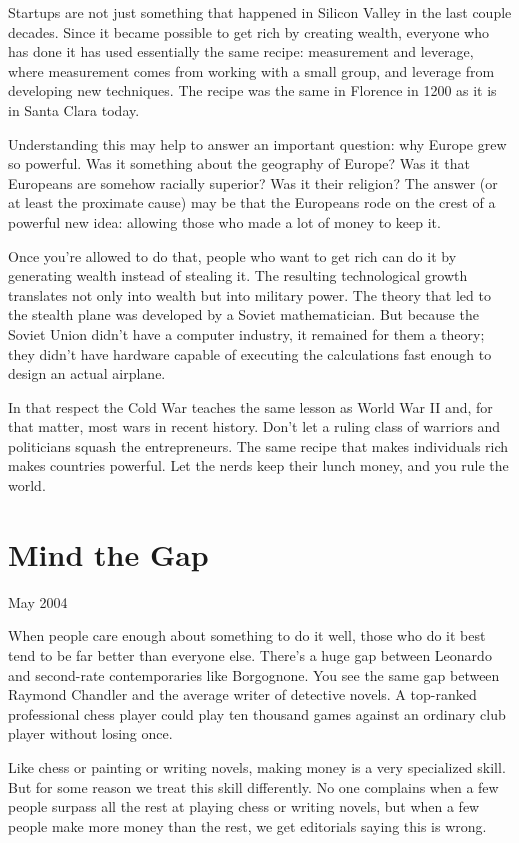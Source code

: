 \documentclass[12pt]{book}
\begin{document}
Startups are not just something that happened in Silicon Valley in the
last couple decades. Since it became possible to get rich by creating
wealth, everyone who has done it has used essentially the same recipe:
measurement and leverage, where measurement comes from working with a
small group, and leverage from developing new techniques. The recipe was
the same in Florence in 1200 as it is in Santa Clara today.

Understanding this may help to answer an important question: why Europe
grew so powerful. Was it something about the geography of Europe? Was it
that Europeans are somehow racially superior? Was it their religion? The
answer (or at least the proximate cause) may be that the Europeans rode
on the crest of a powerful new idea: allowing those who made a lot of
money to keep it.

Once you're allowed to do that, people who want to get rich can do it by
generating wealth instead of stealing it. The resulting technological
growth translates not only into wealth but into military power. The
theory that led to the stealth plane was developed by a Soviet
mathematician. But because the Soviet Union didn't have a computer
industry, it remained for them a theory; they didn't have hardware
capable of executing the calculations fast enough to design an actual
airplane.

In that respect the Cold War teaches the same lesson as World War II
and, for that matter, most wars in recent history. Don't let a ruling
class of warriors and politicians squash the entrepreneurs. The same
recipe that makes individuals rich makes countries powerful. Let the
nerds keep their lunch money, and you rule the world.
\chapter{Mind the Gap}

May 2004

When people care enough about something to do it well, those who do it
best tend to be far better than everyone else. There's a huge gap
between Leonardo and second-rate contemporaries like Borgognone. You see
the same gap between Raymond Chandler and the average writer of
detective novels. A top-ranked professional chess player could play ten
thousand games against an ordinary club player without losing once.

Like chess or painting or writing novels, making money is a very
specialized skill. But for some reason we treat this skill differently.
No one complains when a few people surpass all the rest at playing chess
or writing novels, but when a few people make more money than the rest,
we get editorials saying this is wrong.
\end{document}
